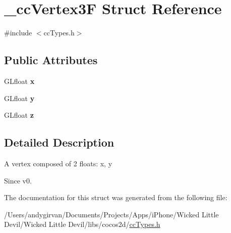 \hypertarget{struct__cc_vertex3_f}{\section{\-\_\-cc\-Vertex3\-F Struct Reference}
\label{struct__cc_vertex3_f}
}


{\ttfamily \#include $<$cc\-Types.\-h$>$}

\subsection*{Public Attributes}
\begin{DoxyCompactItemize}
\item 
\hypertarget{struct__cc_vertex3_f_a198fa0634e97bcce2fcbf479c6ef4aeb}{G\-Lfloat {\bfseries x}}\label{struct__cc_vertex3_f_a198fa0634e97bcce2fcbf479c6ef4aeb}

\item 
\hypertarget{struct__cc_vertex3_f_a90f846c0ac28ba11c0b158c145c77ceb}{G\-Lfloat {\bfseries y}}\label{struct__cc_vertex3_f_a90f846c0ac28ba11c0b158c145c77ceb}

\item 
\hypertarget{struct__cc_vertex3_f_a00f941832e3ad04d0ad1d85f179aa154}{G\-Lfloat {\bfseries z}}\label{struct__cc_vertex3_f_a00f941832e3ad04d0ad1d85f179aa154}

\end{DoxyCompactItemize}


\subsection{Detailed Description}
A vertex composed of 2 floats\-: x, y \begin{DoxySince}{Since}
v0. 
\end{DoxySince}


The documentation for this struct was generated from the following file\-:\begin{DoxyCompactItemize}
\item 
/\-Users/andygirvan/\-Documents/\-Projects/\-Apps/i\-Phone/\-Wicked Little Devil/\-Wicked Little Devil/libs/cocos2d/\hyperlink{cc_types_8h}{cc\-Types.\-h}\end{DoxyCompactItemize}
